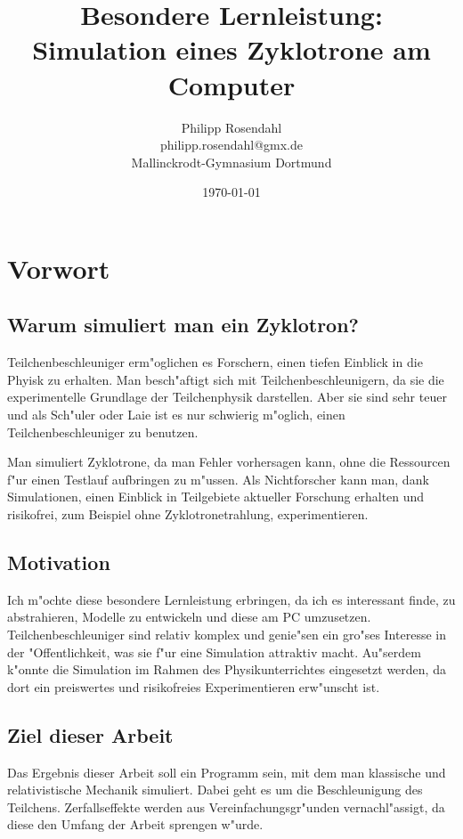 \documentclass[14pt, a4paper]{report}
\begin{document}

\title{\bfseries \Large Besondere Lernleistung: \\ \Huge \color{titleblue}Simulation eines Zyklotrone am Computer}
\author{Philipp Rosendahl \\ philipp.rosendahl@gmx.de \\ Mallinckrodt-Gymnasium Dortmund}
\date{\today}

\maketitle

\tableofcontents

\chapter{Vorwort}
\section{Warum simuliert man ein Zyklotron?}
Teilchenbeschleuniger erm"oglichen es Forschern, einen tiefen Einblick in die
Phyisk zu erhalten. Man besch"aftigt sich mit Teilchenbeschleunigern, da sie die
experimentelle Grundlage der Teilchenphysik darstellen. Aber sie sind sehr
teuer und als Sch"uler oder Laie ist es nur schwierig m"oglich, einen
Teilchenbeschleuniger zu benutzen.

Man simuliert Zyklotrone, da man Fehler vorhersagen kann, ohne die Ressourcen
f"ur einen Testlauf aufbringen zu m"ussen. Als Nichtforscher kann man, dank 
Simulationen, einen Einblick in Teilgebiete aktueller Forschung erhalten und risikofrei,
zum Beispiel ohne Zyklotronetrahlung, experimentieren.

\section{Motivation}
Ich m"ochte diese besondere Lernleistung erbringen, da ich es interessant finde, 
zu abstrahieren, Modelle zu entwickeln und diese am PC umzusetzen. 
Teilchenbeschleuniger sind relativ komplex und genie"sen ein gro"ses Interesse
in der "Offentlichkeit, was sie f"ur eine Simulation attraktiv macht. Au"serdem
k"onnte die Simulation im Rahmen des Physikunterrichtes eingesetzt werden, da dort 
ein preiswertes und risikofreies Experimentieren erw"unscht ist.
\section{Ziel dieser Arbeit}
Das Ergebnis dieser Arbeit soll ein Programm sein, mit dem man klassische und 
relativistische Mechanik simuliert. Dabei geht es um die Beschleunigung des Teilchens.
Zerfallseffekte werden aus Vereinfachungsgr"unden vernachl"assigt, da diese den
Umfang der Arbeit sprengen w"urde.
\end{document}

